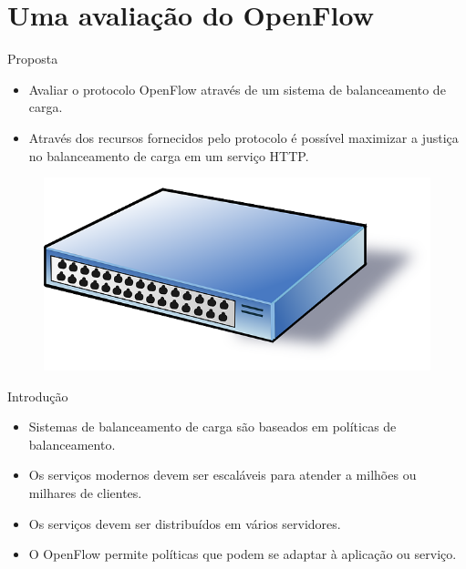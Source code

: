 \section{Uma avaliação do OpenFlow}

\begin{frame}{Proposta}

    \begin{itemize}
        \item Avaliar o protocolo OpenFlow através de um sistema de
            balanceamento de carga.
        \item Através dos recursos fornecidos pelo protocolo é possível 
            maximizar a justiça no balanceamento de carga em um serviço HTTP.
    \end{itemize}

    \begin{figure}[!htb]
        \centering
        \includegraphics[scale=.3]{images/cartoon-switch}
    \end{figure}
\end{frame}


\begin{frame}{Introdução}
    \begin{itemize}
        \setlength{\itemsep}{.5cm}
        \item Sistemas de balanceamento de carga são baseados em políticas 
            de balanceamento.
        \item Os serviços modernos devem ser escaláveis para atender a 
            milhões ou milhares de clientes.
        \item Os serviços devem ser distribuídos em vários servidores. 
        \item O OpenFlow permite políticas que podem se adaptar à aplicação 
            ou serviço.
    \end{itemize} 
\end{frame}


